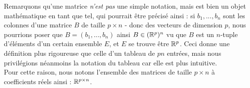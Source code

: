 \noindent Remarquons qu'une matrice \textit{n'est pas} une simple notation, mais est bien un objet mathématique en tant que tel, qui pourrait être précisé ainsi : si $b_1, ..., b_n$ sont les colonnes d'une matrice $B$ de taille $p \times n$ - donc des vecteurs de dimension $p$, nous pourrions poser que $B = (b_1, ..., b_n)$ ainsi $B \in (\mathbb{R}^p)^n$ vu que $B$ est un $n$-tuple d'éléments d'un certain ensemble $E$, et $E$ se trouve être $\mathbb{R}^p$. Ceci donne une définition plus rigoureuse que celle d'un tableau de $pn$ entrées, mais nous privilégions néanmoins la notation du tableau car elle est plus intuitive. \\
Pour cette raison, nous notons l'ensemble des matrices de taille $p \times n$ à coefficients réels ainsi : $\mathbb{R}^{p \times n}$.\\